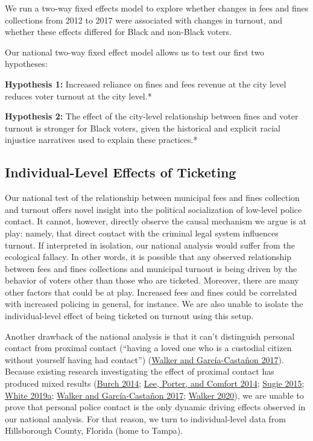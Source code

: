 \documentclass[
  12pt,
]{article}
\begin{document}
We run a two-way fixed effects model to explore whether changes in fees and fines collections from 2012 to 2017 were associated with changes in turnout, and whether these effects differed for Black and non-Black voters.

Our national two-way fixed effect model allows us to test our first two hypotheses:

\textbf{Hypothesis 1:} Increased reliance on fines and fees revenue at the city level reduces voter turnout at the city level.*

\textbf{Hypothesis 2:} The effect of the city-level relationship between fines and voter turnout is stronger for Black voters, given the historical and explicit racial injustice narratives used to explain these practices.*

\hypertarget{individual-level-effects-of-ticketing}{%
\subsection*{Individual-Level Effects of Ticketing}\label{individual-level-effects-of-ticketing}}

Our national test of the relationship between municipal fees and fines collection and turnout offers novel insight into the political socialization of low-level police contact. It cannot, however, directly observe the causal mechanism we argue is at play: namely, that direct contact with the criminal legal system influences turnout. If interpreted in isolation, our national analysis would suffer from the ecological fallacy. In other words, it is possible that any observed relationship between fees and fines collections and municipal turnout is being driven by the behavior of voters other than those who are ticketed. Moreover, there are many other factors that could be at play. Increased fees and fines could be correlated with increased policing in general, for instance. We are also unable to isolate the individual-level effect of being ticketed on turnout using this setup.

Another drawback of the national analysis is that it can't distinguish personal contact from proximal contact (``having a loved one who is a custodial citizen without yourself having had contact'') (\protect\hyperlink{ref-Walker2017}{Walker and García-Castañon 2017}). Because existing research investigating the effect of proximal contact has produced mixed results (\protect\hyperlink{ref-Burch2014}{Burch 2014}; \protect\hyperlink{ref-Lee2014}{Lee, Porter, and Comfort 2014}; \protect\hyperlink{ref-Sugie2015}{Sugie 2015}; \protect\hyperlink{ref-White2019}{White 2019a}; \protect\hyperlink{ref-Walker2017}{Walker and García-Castañon 2017}; \protect\hyperlink{ref-Walker2020}{Walker 2020}), we are unable to prove that personal police contact is the only dynamic driving effects observed in our national analysis. For that reason, we turn to individual-level data from Hillsborough County, Florida (home to Tampa).
\end{document}

